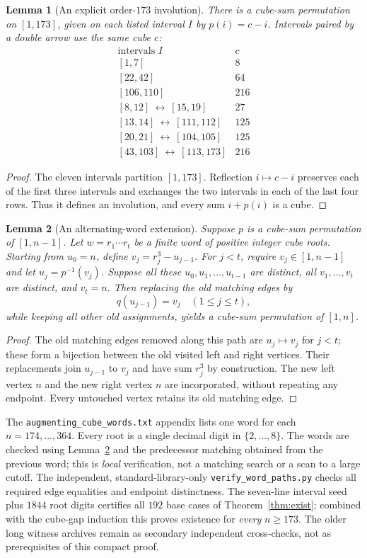 \documentclass[10pt]{article}
\newtheorem{lemma}{Lemma}
\begin{document}
\begin{lemma}[An explicit order-$173$ involution]\label{lem:seed173}
There is a cube-sum permutation on $[1,173]$, given on
each listed interval $I$ by $p(i)=c-i$. Intervals
paired by a double arrow use the same cube $c$:
\[
\begin{array}{c|c}
\text{intervals }I&c\\\hline
{[1,7]}&8\\
{[22,42]}&64\\
{[106,110]}&216\\
{[8,12]}\ \longleftrightarrow\ [15,19]&27\\
{[13,14]}\ \longleftrightarrow\ [111,112]&125\\
{[20,21]}\ \longleftrightarrow\ [104,105]&125\\
{[43,103]}\ \longleftrightarrow\ [113,173]&216
\end{array}
\]
\end{lemma}
\begin{proof}
The eleven intervals partition $[1,173]$.
Reflection $i\mapsto c-i$ preserves each of the
first three intervals and exchanges the two intervals
in each of the last four rows. Thus it defines an
involution, and every sum $i+p(i)$ is a cube.
\end{proof}

\begin{lemma}[An alternating-word extension]\label{lem:words}
Suppose $p$ is a cube-sum permutation of $[1,n-1]$.
Let $w=r_1\cdots r_t$ be a finite word of positive
integer cube roots. Starting from $u_0=n$, define
$v_j=r_j^3-u_{j-1}$. For $j<t$, require $v_j\in[1,n-1]$
and let $u_j=p^{-1}(v_j)$. Suppose all these
$u_0,u_1,\dots,u_{t-1}$ are distinct,
all $v_1,\dots,v_t$ are distinct, and $v_t=n$.
Then replacing the old matching edges by
\[
q(u_{j-1})=v_j\quad (1\le j\le t),
\]
while keeping all other old assignments, yields
a cube-sum permutation of $[1,n]$.
\end{lemma}
\begin{proof}
The old matching edges removed along this path are
$u_j\mapsto v_j$ for $j<t$; these form a bijection
between the old visited left and right vertices.
Their replacements join $u_{j-1}$ to $v_j$ and have
sum $r_j^3$ by construction. The new left vertex $n$
and the new right vertex $n$ are incorporated, without
repeating any endpoint. Every untouched vertex retains
its old matching edge.
\end{proof}

The \texttt{augmenting\_cube\_words.txt} appendix lists
one word for each $n=174,\dots,364$.
Every root is a single decimal digit in $\{2,\dots,8\}$.
The words are checked using Lemma~\ref{lem:words}
and the predecessor matching obtained from the previous
word; this is \emph{local} verification, not a
matching search or a scan to a large cutoff.
The independent, standard-library-only
\texttt{verify\_word\_paths.py} checks
all required edge equalities and endpoint distinctness.
The seven-line interval seed plus $1844$ root digits
certifies all $192$ base cases of
Theorem~\ref{thm:exist}; combined with the
cube-gap induction this proves existence for
\emph{every} $n\ge173$.
The older long witness archives remain as secondary
independent cross-checks, not as prerequisites
of this compact proof.
\end{document}
